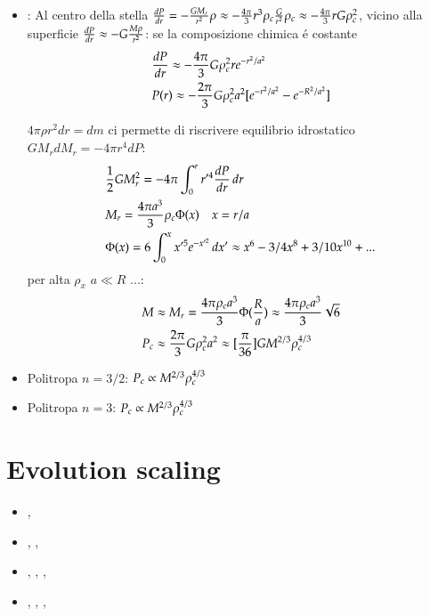 \begin{itemize}
\item {}:
Al centro della stella $\TDy{r}{P}=-\frac{GM_r}{r^2}\rho\approx-\frac{4\pi}{3}r^3\rho_c\frac{G}{r^2}\rho_c\approx-\frac{4\pi}{3}rG\rho_c^2$, vicino alla superficie $\TDy{r}{P}\approx-G\frac{M\rho}{r^2}$: se la composizione chimica \'e costante
\begin{align*}
&\TDy{r}{P}\approx-\frac{4\pi}{3}G\rho_c^2r\exp{-r^2/a^2}\\
&P(r)\approx-\frac{2\pi}{3}G\rho_c^2a^2[\exp{-r^2/a^2}-\exp{-R^2/a^2}]
\end{align*}

$4\pi\rho r^2dr=dm$ ci permette di riscrivere equilibrio idrostatico $GM_rdM_r=-4\pi r^4dP$:
\begin{align*}
&\frac{1}{2}GM_r^2=-4\pi\int_0^rr'^4\TDy{r}{P}\,dr\\
&M_r=\frac{4\pi a^3}{3}\rho_c\Phi(x)\quad x=r/a\\
&\Phi(x)=6\int_0^xx'^5\exp{-x'^2}\,dx'\approx x^6-3/4x^8+3/10x\expy{10}+...
\end{align*}
per alta $\rho_x$ $a\ll R$ ...:
\begin{align*}
&M\approx M_r=\frac{4\pi\rho_ca^3}{3}\Phi(\frac{R}{a})\approx\frac{4\pi\rho_ca^3}{3}\sqrt{6}\\
&P_c\approx\frac{2\pi}{3}G\rho_c^2a^2\approx[\frac{\pi}{36}]GM\expy{2/3}\rho_c\expy{4/3}
\end{align*}

\item Politropa $n=3/2$: $P_c\propto M\expy{2/3}\rho_c\expy{4/3}$

\item Politropa $n=3$: $P_c\propto M\expy{2/3}\rho_c\expy{4/3}$

\end{itemize}

\section{Evolution scaling}

\begin{itemize}
    \item {}, \xdiminuisce{\tau}
    \item {}, , 
    \item {}, , , \xaumenta{\tau}
    \item {}, , , \xdiminuisce{\tau}
\end{itemize}

